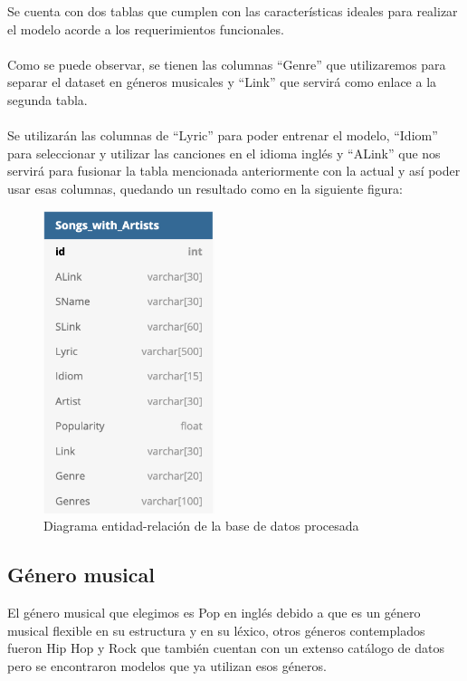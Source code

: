 \documentclass[12pt, a4paper, titlepage]{report}
\begin{document}
		Se cuenta con dos tablas que cumplen con las características ideales para realizar el modelo acorde a los requerimientos funcionales.\\\\
		Como se puede observar, se tienen las columnas “Genre” que utilizaremos para separar el dataset en géneros musicales y “Link” que servirá como enlace a la segunda tabla.\\\\
		Se utilizarán las columnas de “Lyric” para poder entrenar el modelo, “Idiom” para seleccionar y utilizar las canciones en el idioma inglés y “ALink” que nos servirá para fusionar la tabla mencionada anteriormente con la actual y así poder usar esas columnas, quedando un resultado como en la siguiente figura:
		\begin{figure}[H]
			\includegraphics[width=5cm]{./imagenes/Disenio/Iteracion_1/Base_de_Datos/Songs_with_Artists.png}
			\centering 
			\caption{Diagrama entidad-relación de la base de datos procesada}
		\end{figure}
		\subsection{Género musical} %
		El género musical que elegimos es Pop en inglés debido a que es un género musical flexible en su estructura y en su léxico, otros géneros contemplados fueron Hip Hop y Rock que también cuentan con un extenso catálogo de datos pero se encontraron modelos que ya utilizan esos géneros.
		
\end{document}
